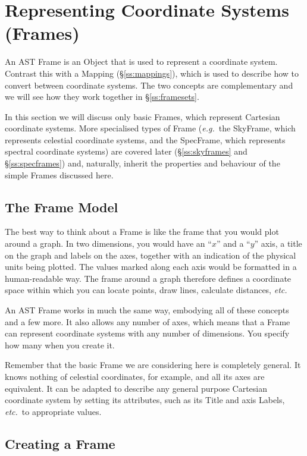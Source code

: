 \documentclass[twoside,11pt]{article}
\newcommand{\secref}[1]{\S\ref{#1}}
\newcommand{\secref}[1]{\ref{#1}}
\begin{document}
\cleardoublepage
\section{\label{ss:frames}Representing Coordinate Systems (Frames)}

An AST Frame is an Object that is used to represent a coordinate
system. Contrast this with a Mapping (\secref{ss:mappings}), which is
used to describe how to convert between coordinate systems. The two
concepts are complementary and we will see how they work together in
\secref{ss:framesets}.

In this section we will discuss only basic Frames, which represent
Cartesian coordinate systems. More specialised types of Frame
({\em{e.g.}}\ the SkyFrame, which represents celestial coordinate
systems, and the SpecFrame, which represents spectral coordinate
systems) are covered later (\secref{ss:skyframes} and \secref{ss:specframes}) 
and, naturally, inherit the properties and behaviour of the simple Frames 
discussed here.

\subsection{The Frame Model}

The best way to think about a Frame is like the frame that you would
plot around a graph. In two dimensions, you would have an ``$x$'' and
a ``$y$'' axis, a title on the graph and labels on the axes, together
with an indication of the physical units being plotted. The values
marked along each axis would be formatted in a human-readable way. The
frame around a graph therefore defines a coordinate space within which
you can locate points, draw lines, calculate distances, {\em{etc.}}

An AST Frame works in much the same way, embodying all of these
concepts and a few more. It also allows any number of axes, which
means that a Frame can represent coordinate systems with any number of
dimensions. You specify how many when you create it.

Remember that the basic Frame we are considering here is completely
general.  It knows nothing of celestial coordinates, for example, and
all its axes are equivalent. It can be adapted to describe any general
purpose Cartesian coordinate system by setting its attributes, such as
its Title and axis Labels, {\em{etc.}}\ to appropriate values.

\subsection{\label{ss:creatingframes}Creating a Frame}
\end{document}

